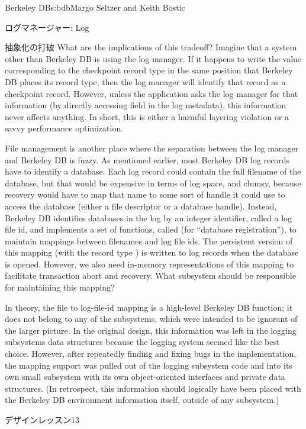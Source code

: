 \begin{aosachapter}{Berkeley DB}{s:bdb}{Margo Seltzer and Keith Bostic}
\begin{aosasect1}{ログマネージャー: Log}
\begin{aosasect2}{抽象化の打破}
What are the implications of this tradeoff? Imagine that a system
other than Berkeley DB is using the log manager. If it happens to
write the value corresponding to the checkpoint record type in the
same position that Berkeley DB places its record type, then the log
manager will identify that record as a checkpoint record. However,
unless the application asks the log manager for that information (by
directly accessing  field in the log metadata),
this information never affects anything. In short, this is either a
harmful layering violation or a savvy performance optimization.

File management is another place where the separation between the log
manager and Berkeley DB is fuzzy. As mentioned earlier, most Berkeley
DB log records have to identify a database. Each log record could
contain the full filename of the database, but that would be
expensive in terms of log space, and clumsy, because recovery would
have to map that name to some sort of handle it could use to access
the database (either a file descriptor or a database handle). Instead,
Berkeley DB identifies databases in the log by an integer identifier,
called a log file id, and implements a set of functions, called
 (for ``database registration''), to maintain mappings
between filenames and log file ids. The persistent version of this
mapping (with the record type )
is written to log records when the database is opened.  However, we also need
in-memory representations of this mapping to facilitate transaction
abort and recovery. What subsystem should be responsible for
maintaining this mapping?

In theory, the file to log-file-id mapping is a high-level Berkeley DB
function; it does not belong to any of the subsystems, which were
intended to be ignorant of the larger picture. In the original design,
this information was left in the logging subsystems data structures
because the logging system seemed like the best choice. However, after
repeatedly finding and fixing bugs in the implementation, the mapping
support was pulled out of the logging subsystem code and into its own
small subsystem with its own object-oriented interfaces and private
data structures.  (In retrospect, this information should logically
have been placed with the Berkeley DB environment information itself,
outside of any subsystem.) 

\begin{aosabox}{デザインレッスン13}


\end{aosabox}
\end{aosasect2}
\end{aosasect1}
\end{aosachapter}
